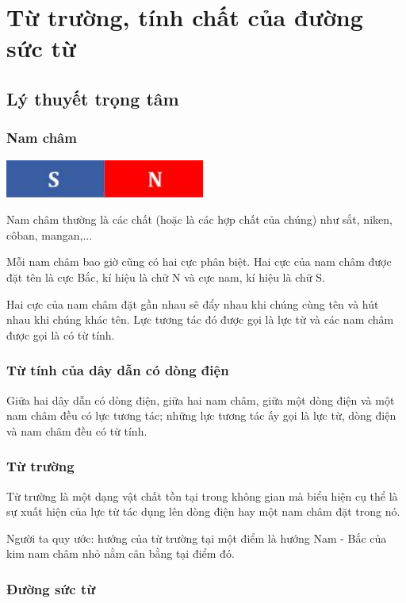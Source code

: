 \chapter{Từ trường, tính chất của đường sức từ}
\section{Lý thuyết trọng tâm}
\subsection{Nam châm}
\begin{center}
	\includegraphics[scale=0.8]{../figs/VN11-PH-24-L-016-1-h103.jpg}
\end{center}

 Nam châm thường là các chất (hoặc là các hợp chất của chúng) như sắt, niken, côban, mangan,...

 Mỗi nam châm bao giờ cũng có hai cực phân  biệt. Hai cực của nam châm được đặt tên là cực Bắc, kí hiệu là chữ N và cực nam, kí hiệu là chữ S.

 Hai cực của nam châm đặt gần nhau sẽ đẩy nhau khi chúng cùng tên và hút nhau khi chúng khác tên. Lực tương tác đó được gọi là lực từ và các nam châm được gọi là có từ tính.

\subsection{Từ tính của dây dẫn có dòng điện}

 Giữa hai dây dẫn có dòng điện, giữa hai nam châm, giữa một dòng điện và một nam châm đều có lực tương tác; những lực tương tác ấy gọi là lực từ, dòng điện và nam châm đều có từ tính.


\subsection{Từ trường}

Từ trường là một dạng vật chất tồn tại trong không gian mà biểu hiện cụ thể là sự xuất hiện của lực từ tác dụng lên dòng điện hay một nam châm đặt trong nó. 

Người ta quy ước: hướng của từ trường tại một điểm là hướng Nam - Bắc của kim nam châm nhỏ nằm cân bằng tại điểm đó.

\subsection{Đường sức từ}
